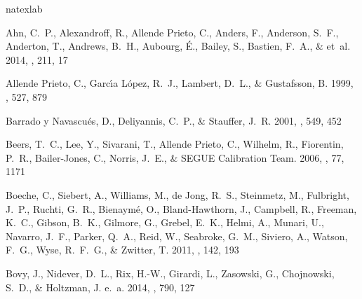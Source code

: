 \documentclass[12pt, preprint]{aastex}
\begin{document}
\begin{thebibliography}{23}
\expandafter\ifx\csname natexlab\endcsname\relax\def\natexlab#1{#1}\fi

{Ahn}, C.~P., {Alexandroff}, R., {Allende Prieto}, C., {Anders}, F.,
  {Anderson}, S.~F., {Anderton}, T., {Andrews}, B.~H., {Aubourg}, {\'E}.,
  {Bailey}, S., {Bastien}, F.~A., \& et~al. 2014, \apjs, 211, 17

{Allende Prieto}, C., {Garc{\'{\i}}a L{\'o}pez}, R.~J., {Lambert}, D.~L., \&
  {Gustafsson}, B. 1999, \apj, 527, 879

{Barrado y Navascu{\'e}s}, D., {Deliyannis}, C.~P., \& {Stauffer}, J.~R. 2001,
  \apj, 549, 452

{Beers}, T.~C., {Lee}, Y., {Sivarani}, T., {Allende Prieto}, C., {Wilhelm}, R.,
  {Fiorentin}, P.~R., {Bailer-Jones}, C., {Norris}, J.~E., \& {SEGUE
  Calibration Team}. 2006, \memsai, 77, 1171

{Boeche}, C., {Siebert}, A., {Williams}, M., {de Jong}, R.~S., {Steinmetz}, M.,
  {Fulbright}, J.~P., {Ruchti}, G.~R., {Bienaym{\'e}}, O., {Bland-Hawthorn},
  J., {Campbell}, R., {Freeman}, K.~C., {Gibson}, B.~K., {Gilmore}, G.,
  {Grebel}, E.~K., {Helmi}, A., {Munari}, U., {Navarro}, J.~F., {Parker},
  Q.~A., {Reid}, W., {Seabroke}, G.~M., {Siviero}, A., {Watson}, F.~G., {Wyse},
  R.~F.~G., \& {Zwitter}, T. 2011, \aj, 142, 193

{Bovy}, J., {Nidever}, D.~L., {Rix}, H.-W., {Girardi}, L., {Zasowski}, G.,
  {Chojnowski}, S.~D., \& {Holtzman}, J. e.~a. 2014, \apj, 790, 127


\end{thebibliography}
\end{document}
